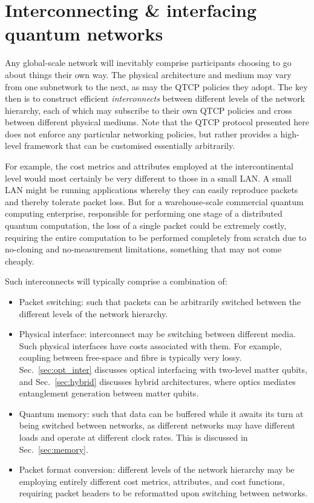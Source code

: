 \documentclass[aps,rmp,twocolumn,amsmath,amssymb,nofootinbib,superscriptaddress]{revtex4}
\begin{document}
%
%

\section{Interconnecting \& interfacing quantum networks} \label{sec:inter}

Any global-scale network will inevitably comprise participants choosing to go about things their own way. The physical architecture and medium may vary from one subnetwork to the next, as may the QTCP policies they adopt. The key then is to construct efficient \emph{interconnects} between different levels of the network hierarchy, each of which may subscribe to their own QTCP policies and cross between different physical mediums. Note that the QTCP protocol presented here does not enforce any particular networking policies, but rather provides a high-level framework that can be customised essentially arbitrarily.

For example, the cost metrics and attributes employed at the intercontinental level would most certainly be very different to those in a small LAN. A small LAN might be running applications whereby they can easily reproduce packets and thereby tolerate packet loss. But for a warehouse-scale commercial quantum computing enterprise, responsible for performing one stage of a distributed quantum computation, the loss of a single packet could be extremely costly, requiring the entire computation to be performed completely from scratch due to no-cloning and no-measurement limitations, something that may not come cheaply.

Such interconnects will typically comprise a combination of:
\begin{itemize}
\item Packet switching: such that packets can be arbitrarily switched between the different levels of the network hierarchy.
\item Physical interface: interconnect may be switching between different media. Such physical interfaces have costs associated with them. For example, coupling between free-space and fibre is typically very lossy. Sec.~\ref{sec:opt_inter} discusses optical interfacing with two-level matter qubits, and Sec.~\ref{sec:hybrid} discusses hybrid architectures, where optics mediates entanglement generation between matter qubits.
\item Quantum memory: such that data can be buffered while it awaits its turn at being switched between networks, as different networks may have different loads and operate at different clock rates. This is discussed in Sec.~\ref{sec:memory}.
\item Packet format conversion: different levels of the network hierarchy may be employing entirely different cost metrics, attributes, and cost functions, requiring packet headers to be reformatted upon switching between networks.
\end{itemize}
\end{document}
